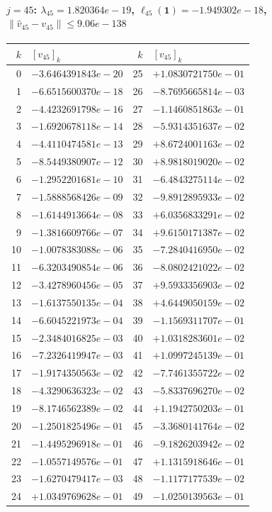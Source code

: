 \documentclass[11pt]{article}
\begin{document}
\paragraph{$j = 45$: $\lambda_{45} = 1.820364e-19$, \quad $\ell_{45}(\mathbf{1}) = -1.949302e-18$, \quad $\|\hat v_{45} - v_{45}\| \leq 9.06e-138$}
\begin{center}
{\footnotesize
\begin{tabular}{r@{\;\;}l@{\quad}r@{\;\;}l}
\toprule
$k$ & $[v_{45}]_k$ & $k$ & $[v_{45}]_k$ \\
\midrule
0 & $-3.6464391843e-20$ & 25 & $+1.0830721750e-01$ \\
1 & $-6.6515600370e-18$ & 26 & $-8.7695665814e-03$ \\
2 & $-4.4232691798e-16$ & 27 & $-1.1460851863e-01$ \\
3 & $-1.6920678118e-14$ & 28 & $-5.9314351637e-02$ \\
4 & $-4.4110474581e-13$ & 29 & $+8.6724001163e-02$ \\
5 & $-8.5449380907e-12$ & 30 & $+8.9818019020e-02$ \\
6 & $-1.2952201681e-10$ & 31 & $-6.4843275114e-02$ \\
7 & $-1.5888568426e-09$ & 32 & $-9.8912895933e-02$ \\
8 & $-1.6144913664e-08$ & 33 & $+6.0356833291e-02$ \\
9 & $-1.3816609766e-07$ & 34 & $+9.6150171387e-02$ \\
10 & $-1.0078383088e-06$ & 35 & $-7.2840416950e-02$ \\
11 & $-6.3203490854e-06$ & 36 & $-8.0802421022e-02$ \\
12 & $-3.4278960456e-05$ & 37 & $+9.5933356903e-02$ \\
13 & $-1.6137550135e-04$ & 38 & $+4.6449050159e-02$ \\
14 & $-6.6045221973e-04$ & 39 & $-1.1569311707e-01$ \\
15 & $-2.3484016825e-03$ & 40 & $+1.0318283601e-02$ \\
16 & $-7.2326419947e-03$ & 41 & $+1.0997245139e-01$ \\
17 & $-1.9174350563e-02$ & 42 & $-7.7461355722e-02$ \\
18 & $-4.3290636323e-02$ & 43 & $-5.8337696270e-02$ \\
19 & $-8.1746562389e-02$ & 44 & $+1.1942750203e-01$ \\
20 & $-1.2501825496e-01$ & 45 & $-3.3680141764e-02$ \\
21 & $-1.4495296918e-01$ & 46 & $-9.1826203942e-02$ \\
22 & $-1.0557149576e-01$ & 47 & $+1.1315918646e-01$ \\
23 & $-1.6270479417e-03$ & 48 & $-1.1177177539e-02$ \\
24 & $+1.0349769628e-01$ & 49 & $-1.0250139563e-01$ \\
\bottomrule
\end{tabular}
}
\end{center}
\end{document}
